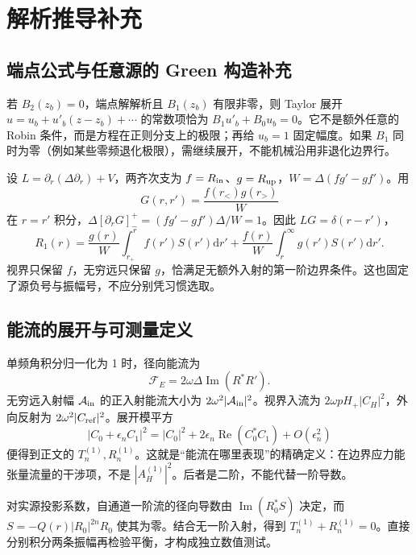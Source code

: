 \documentclass[UTF8,fontset=fandol,12pt,a4paper,oneside,openany]{ctexrep}
\newcommand{\dd}{\mathrm d}
\newcommand{\Ree}{\operatorname{Re}}
\newcommand{\Imm}{\operatorname{Im}}
\begin{document}
\appendix
\chapter{解析推导补充}

\section{端点公式与任意源的 Green 构造补充}
若 $B_2(z_b)=0$，端点解解析且 $B_1(z_b)$ 有限非零，则 Taylor 展开 $u=u_b+u'_b(z-z_b)+\cdots$ 的常数项恰为 $B_1u'_b+B_0u_b=0$。它不是额外任意的 Robin 条件，而是方程在正则分支上的极限；再给 $u_b=1$ 固定幅度。如果 $B_1$ 同时为零（例如某些零频退化极限），需继续展开，不能机械沿用非退化边界行。

设 $L=\partial_r(\Delta\partial_r)+V$，两齐次支为 $f=R_{\rm in}$、$g=R_{\rm up}$，$W=\Delta(fg'-gf')$。用
\begin{equation}
 G(r,r')=\frac{f(r_<)g(r_>)}{W}
\end{equation}
在 $r=r'$ 积分，$\Delta[\partial_rG]_-^+=(fg'-gf')\Delta/W=1$。因此 $LG=\delta(r-r')$，
\begin{equation}
 R_1(r)=\frac{g(r)}W\int_{r_+}^{r}f(r')S(r')\dd r'
 +\frac{f(r)}W\int_r^\infty g(r')S(r')\dd r'.
\end{equation}
视界只保留 $f$，无穷远只保留 $g$，恰满足无额外入射的第一阶边界条件。这也固定了源负号与振幅号，不应分别凭习惯选取。

\section{能流的展开与可测量定义}
单频角积分归一化为 1 时，径向能流为
\begin{equation}
 \mathcal F_E=2\omega\Delta\Imm(R^*R').
\end{equation}
无穷远入射幅 $\mathcal A_{\rm in}$ 的正入射能流大小为 $2\omega^2|\mathcal A_{\rm in}|^2$。视界入流为 $2\omega pH_+|C_H|^2$，外向反射为 $2\omega^2|C_{\rm ref}|^2$。展开模平方
\begin{equation}
 |C_0+\epsilon_n C_1|^2=|C_0|^2+
 2\epsilon_n\Ree(C_0^*C_1)+O(\epsilon_n^2)
\end{equation}
便得到正文的 $T_n^{(1)},R_n^{(1)}$。这就是“能流在哪里表现”的精确定义：在边界应力能张量流量的干涉项，不是 $|A_H^{(1)}|^2$。后者是二阶，不能代替一阶导数。

对实源投影系数，自通道一阶流的径向导数由 $\Imm(R_0^*S)$ 决定，而 $S=-Q(r)|R_0|^{2n}R_0$ 使其为零。结合无一阶入射，得到 $T_n^{(1)}+R_n^{(1)}=0$。直接分别积分两条振幅再检验平衡，才构成独立数值测试。
\end{document}
